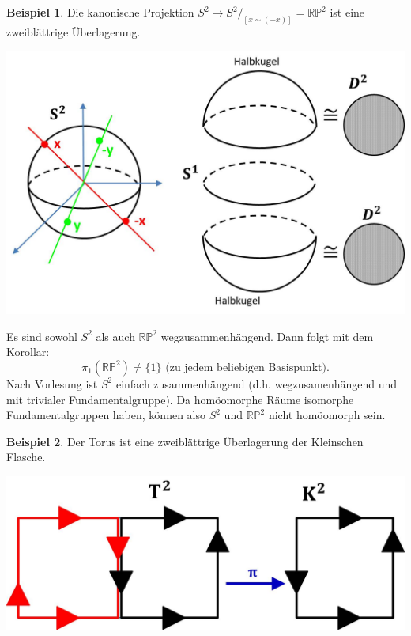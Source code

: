 \documentclass[a4paper,11pt,notitlepage]{report}
\theoremstyle{definition}
\newtheorem{example}{Beispiel}[chapter]
\newcommand{\R}{{\ensuremath{\mathbb{R}}}}
\newcommand{\Prim}{{\ensuremath{\mathbb{P}}}}
\begin{document}
\begin{example}
	Die kanonische Projektion $S^2 \rightarrow S^2/_{[x \sim (-x)]} = \R \Prim^2$ ist eine zweiblättrige Überlagerung. 
\begin{center}
	\includegraphics[scale=0.5]{images/2011_12_19_Bild4.jpg}
\end{center}
	Es sind sowohl $S^2$ als auch $\R \Prim^2$ wegzusammenhängend. Dann folgt mit dem Korollar: 
	$$\pi_1(\R \Prim^2) \neq \{1\} \text{ (zu jedem beliebigen Basispunkt)}.$$
	Nach Vorlesung ist $S^2$ einfach zusammenhängend (d.h. wegzusamenhängend und mit trivialer Fundamentalgruppe). Da homöomorphe Räume isomorphe Fundamentalgruppen haben, können also $S^2$ und $\R \Prim^2$ nicht homöomorph sein.
\end{example}

\begin{example}
	Der Torus ist eine zweiblättrige Überlagerung der Kleinschen Flasche.
	
\begin{center}
	\includegraphics[scale=0.5]{images/2011_12_19_Bild5.jpg}
\end{center}
\end{example}
\end{document}
